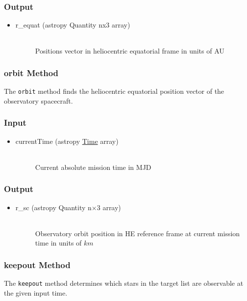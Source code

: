 \documentclass[cleanfoot]{asme2ej}
\begin{document}
\subsubsection*{Output}
\begin{itemize}
\item
\begin{description}
    \item[r\_equat (astropy Quantity nx3 array)] \hfill \\ Positions vector in heliocentric equatorial frame in units of AU
\end{description}
\end{itemize}

\subsubsection{orbit Method} \label{sec:orbittask}
The \verb+orbit+ method finds the heliocentric equatorial position vector of the observatory spacecraft.
\subsubsection*{Input}
\begin{itemize}
\item
\begin{description}
    \item[currentTime (astropy \href{http://astropy.readthedocs.org/en/latest/time/index.html}{Time} array)] \hfill \\ Current absolute mission time in MJD
\end{description}
\end{itemize}
\subsubsection*{Output}
\begin{itemize}
\item
\begin{description}
    \item[r\_sc (astropy Quantity n$\times$3 array)] \hfill \\ Observatory orbit position in HE reference frame at current mission time in units of $ km $
\end{description}
\end{itemize}

\subsubsection{keepout Method} \label{sec:keepouttask} 
The \verb+keepout+ method determines which stars in the target list are observable at the given input time.
\end{document}
